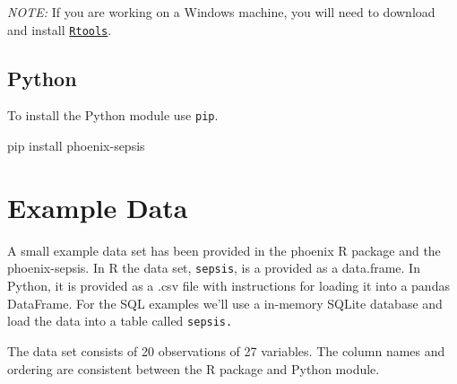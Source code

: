 \documentclass[
  letterpaper,
  DIV=11,
  numbers=noendperiod]{scrartcl}
\newenvironment{Shaded}{\begin{snugshade}}{\end{snugshade}}
\newcommand{\NormalTok}[1]{\textcolor[rgb]{0.00,0.23,0.31}{#1}}
\newcommand{\OperatorTok}[1]{\textcolor[rgb]{0.37,0.37,0.37}{#1}}
\begin{document}
\emph{NOTE:} If you are working on a Windows machine, you will need to
download and install
\href{https://cran.r-project.org/bin/windows/Rtools/}{\texttt{Rtools}}.

\subsection{Python}\label{python}

To install the Python module use \texttt{pip}.

\begin{Shaded}
\begin{Highlighting}[]
\NormalTok{pip install phoenix}\OperatorTok{{-}}\NormalTok{sepsis}
\end{Highlighting}
\end{Shaded}

\section{Example Data}\label{example-data}

A small example data set has been provided in the phoenix R package and
the phoenix-sepsis. In R the data set, \texttt{sepsis}, is a provided as
a data.frame. In Python, it is provided as a .csv file with instructions
for loading it into a pandas DataFrame. For the SQL examples we'll use a
in-memory SQLite database and load the data into a table called
\texttt{sepsis.}

The data set consists of 20 observations of 27 variables. The column
names and ordering are consistent between the R package and Python
module.
\end{document}
